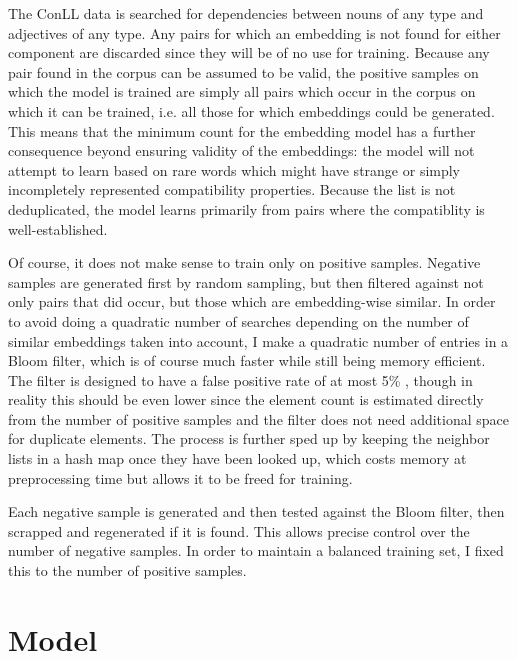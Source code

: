 \documentclass{article}
\begin{document}
The ConLL data is searched for dependencies between nouns of any type and adjectives of any type. Any pairs for which an embedding is not found for either component are discarded since they will be of no use for training. Because any pair found in the corpus can be assumed to be valid, the positive samples on which the model is trained are simply all pairs which occur in the corpus on which it can be trained, i.e. all those for which embeddings could be generated. This means that the minimum count for the embedding model has a further consequence beyond ensuring validity of the embeddings: the model will not attempt to learn based on rare words which might have strange or simply incompletely represented compatibility properties. Because the list is not deduplicated, the model learns primarily from pairs where the compatiblity is well-established.

Of course, it does not make sense to train only on positive samples. Negative samples are generated first by random sampling, but then filtered against not only pairs that did occur, but those which are embedding-wise similar. In order to avoid doing a quadratic number of searches depending on the number of similar embeddings taken into account, I make a quadratic number of entries in a Bloom filter, which is of course much faster while still being memory efficient. The filter is designed to have a false positive rate of at most 5\% , though in reality this should be even lower since the element count is estimated directly from the number of positive samples and the filter does not need additional space for duplicate elements. The process is further sped up by keeping the neighbor lists in a hash map once they have been looked up, which costs memory at preprocessing time but allows it to be freed for training.

Each negative sample is generated and then tested against the Bloom filter, then scrapped and regenerated if it is found. This allows precise control over the number of negative samples. In order to maintain a balanced training set, I fixed this to the number of positive samples.


\section{Model}
\end{document}

